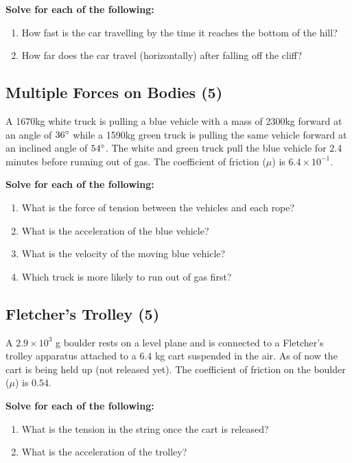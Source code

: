 \documentclass{article}
\begin{document}
\vspace{10pt}

\noindent\textbf{Solve for each of the following:}
\begin{enumerate}[label=\alph*)]
    \item How fast is the car travelling by the time it reaches the bottom of the hill?
    \item How far does the car travel (horizontally) after falling off the cliff?
\end{enumerate}\leavevmode

\subsection{Multiple Forces on Bodies (5)}
A 1670kg white truck is pulling a blue vehicle with a mass of 2300kg forward at an angle of
$36\degree$ while a 1590kg green truck is pulling the same vehicle forward at an inclined
angle of $54\degree$. The white and green truck pull the blue vehicle for 2.4 minutes before
running out of gas. The coefficient of friction ($\mu$) is $6.4\times 10^{-1}$.

\vspace{10pt}

\noindent\textbf{Solve for each of the following:}
\begin{enumerate}[label=\alph*)]
    \item What is the force of tension between the vehicles and each rope?
    \item What is the acceleration of the blue vehicle?
    \item What is the velocity of the moving blue vehicle?
    \item Which truck is more likely to run out of gas first?
\end{enumerate}\leavevmode

\subsection{Fletcher's Trolley (5)}
A $2.9 \times 10^3$ g boulder rests on a level plane and is connected to a Fletcher's trolley apparatus
attached to a $6.4$ kg cart suspended in the air. As of now the cart is being held up (not released yet).
The coefficient of friction on the boulder ($\mu$) is $0.54$.

\vspace{10pt}

\noindent\textbf{Solve for each of the following:}
\begin{enumerate}[label=\alph*)]
    \item What is the tension in the string once the cart is released?
    \item What is the acceleration of the trolley?
\end{enumerate}\leavevmode
\end{document}
